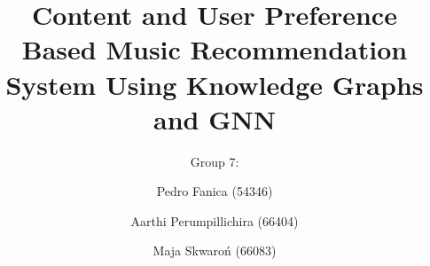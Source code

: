 \documentclass[10pt,twocolumn,letterpaper]{article}
\title{Content and User Preference Based Music Recommendation System Using Knowledge Graphs and GNN}
\author{Group 7:\\
\and
Pedro Fanica (54346)\\
\and
Aarthi Perumpillichira (66404)\\
\and
Maja Skwaroń (66083)\\
}
\begin{document}
\maketitle






{
    \small
    
    
}
\appendix


% 
\end{document}
